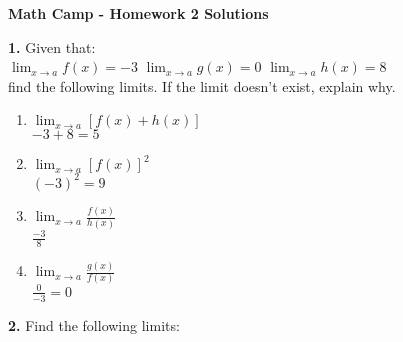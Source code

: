 \documentclass[12pt]{article}
\begin{document}
	
	\centerline{\bf Math Camp - Homework 2 Solutions}

\noindent \textbf{1.} Given that: \\


$\lim_{x \to a} f(x) = -3$ \hfill $\lim_{x \to a} g(x) = 0$ \hfill $\lim_{x \to a} h(x) = 8$\\

find the following limits. If the limit doesn't exist, explain why. 

\begin{enumerate}
\item $\lim_{x \to a} [f(x) + h(x)]$\\
$-3 + 8 = 5$
\item $\lim_{x \to a}  [f(x)]^2$\\
$(-3)^2 = 9$
\item $\lim_{x \to a}  \frac{f(x)}{h(x)}$\\
$\frac{-3}{8}$
\item $\lim_{x \to a}  \frac{g(x)}{f(x)}$\\
$\frac{0}{-3} = 0$
\end{enumerate}

\bigskip
\noindent \textbf{2.} Find the following limits:
\end{document}
